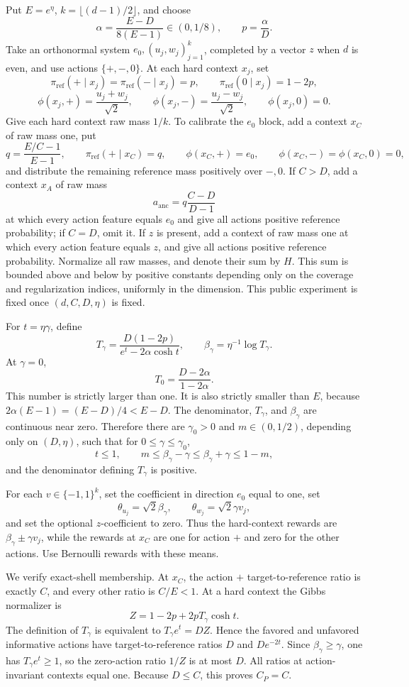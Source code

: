 Put \(E=e^\eta\), \(k=\lfloor(d-1)/2\rfloor\), and choose
\[
\alpha=\frac{E-D}{8(E-1)}\in(0,1/8),
\qquad p=\frac{\alpha}{D}.
\]
Take an orthonormal system \(e_0,(u_j,w_j)_{j=1}^k\), completed by a vector \(z\) when \(d\) is even, and use actions \(\{+,-,0\}\). At each hard context \(x_j\), set
\[
\pi_{\mathrm{ref}}(+\mid x_j)=\pi_{\mathrm{ref}}(-\mid x_j)=p,\qquad
\pi_{\mathrm{ref}}(0\mid x_j)=1-2p,
\]
\[
\phi(x_j,+)=\frac{u_j+w_j}{\sqrt2},\qquad
\phi(x_j,-)=\frac{u_j-w_j}{\sqrt2},\qquad
\phi(x_j,0)=0.
\]
Give each hard context raw mass \(1/k\). To calibrate the \(e_0\) block, add a context \(x_C\) of raw mass one, put
\[
q=\frac{E/C-1}{E-1},\qquad
\pi_{\mathrm{ref}}(+\mid x_C)=q,\qquad
\phi(x_C,+)=e_0,\qquad
\phi(x_C,-)=\phi(x_C,0)=0,
\]
and distribute the remaining reference mass positively over \(-,0\). If \(C>D\), add a context \(x_A\) of raw mass
\[
a_{\mathrm{anc}}=q\frac{C-D}{D-1}
\]
at which every action feature equals \(e_0\) and give all actions positive reference probability; if \(C=D\), omit it. If \(z\) is present, add a context of raw mass one at which every action feature equals \(z\), and give all actions positive reference probability. Normalize all raw masses, and denote their sum by \(H\). This sum is bounded above and below by positive constants depending only on the coverage and regularization indices, uniformly in the dimension. This public experiment is fixed once \((d,C,D,\eta)\) is fixed.

For \(t=\eta\gamma\), define
\[
T_\gamma=\frac{D(1-2p)}{e^t-2\alpha\cosh t},
\qquad \beta_\gamma=\eta^{-1}\log T_\gamma.
\]
At \(\gamma=0\),
\[
T_0=\frac{D-2\alpha}{1-2\alpha}.
\]
This number is strictly larger than one. It is also strictly smaller than \(E\), because \(2\alpha(E-1)=(E-D)/4<E-D\). The denominator, \(T_\gamma\), and \(\beta_\gamma\) are continuous near zero. Therefore there are \(\gamma_0>0\) and \(m\in(0,1/2)\), depending only on \((D,\eta)\), such that for \(0\le\gamma\le\gamma_0\),
\[
t\le1,\qquad m\le\beta_\gamma-\gamma\le\beta_\gamma+\gamma\le1-m,
\]
and the denominator defining \(T_\gamma\) is positive.

For each \(v\in\{-1,1\}^k\), set the coefficient in direction \(e_0\) equal to one, set
\[
\theta_{u_j}=\sqrt2\beta_\gamma,\qquad
\theta_{w_j}=\sqrt2\gamma v_j,
\]
and set the optional \(z\)-coefficient to zero. Thus the hard-context rewards are \(\beta_\gamma\pm\gamma v_j\), while the rewards at \(x_C\) are one for action \(+\) and zero for the other actions. Use Bernoulli rewards with these means.

We verify exact-shell membership. At \(x_C\), the action \(+\) target-to-reference ratio is exactly \(C\), and every other ratio is \(C/E<1\). At a hard context the Gibbs normalizer is
\[
Z=1-2p+2pT_\gamma\cosh t.
\]
The definition of \(T_\gamma\) is equivalent to \(T_\gamma e^t=DZ\). Hence the favored and unfavored informative actions have target-to-reference ratios \(D\) and \(De^{-2t}\). Since \(\beta_\gamma\ge\gamma\), one has \(T_\gamma e^t\ge1\), so the zero-action ratio \(1/Z\) is at most \(D\). All ratios at action-invariant contexts equal one. Because \(D\le C\), this proves \(C_P=C\).

